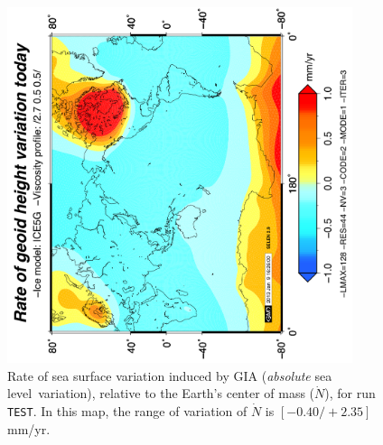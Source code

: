\documentclass[11pt,fleqn,a4paper,titlepage]{article}
\newcommand\sealevel{sea level~}
\begin{document}
\begin{figure}[h]
\begin{center}
\includegraphics[width=0.9\textwidth, angle=-90]{./Figures/ndotmap.png}
\caption[Absolute \sealevel fingerprint]{\small{Rate of sea surface variation induced by GIA (\textit{absolute} \sealevel variation), relative to the Earth's center of mass ($\dot N$), for run \texttt{TEST}. In this map, the range of variation of $\dot N$ is $[-0.40/+2.35]$ mm/yr.}}
\label{fig:ndot}
\end{center}
\end{figure}
\newpage
\end{document}
